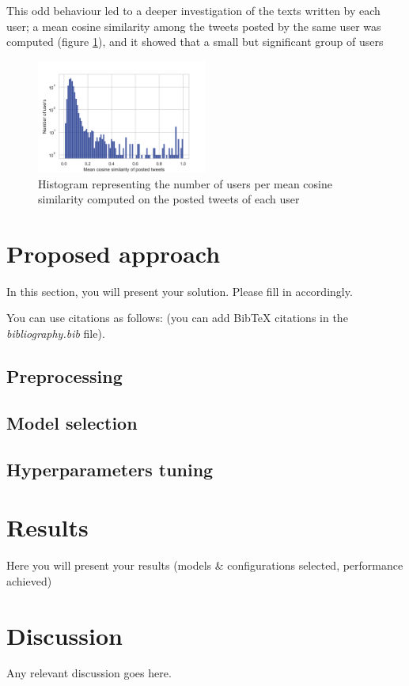 \documentclass[conference]{IEEEtran}
\begin{document}
This odd behaviour led to a deeper investigation of the texts written by each user; a mean cosine similarity among the tweets posted by the same user was computed (figure \ref{fig:internal_similarity_users}), and it showed that a small but significant group of users
\begin{figure}
    \includegraphics[width=0.5\textwidth]{internal_similarity_users}
    \caption[Mean cosine similarity]{Histogram representing the number of users per mean cosine similarity computed on the posted tweets of each user}
    \label{fig:internal_similarity_users}
\end{figure}



\section{Proposed approach}
In this section, you will present your solution. Please fill in accordingly.

You can use citations as follows: \cite{goodfellow2016deep} (you can add BibTeX citations in the \textit{bibliography.bib} file).

\subsection{Preprocessing}
\subsection{Model selection}
\subsection{Hyperparameters tuning}

\section{Results}
Here you will present your results (models \& configurations selected, performance achieved)

\section{Discussion}
Any relevant discussion goes here.



\end{document}
